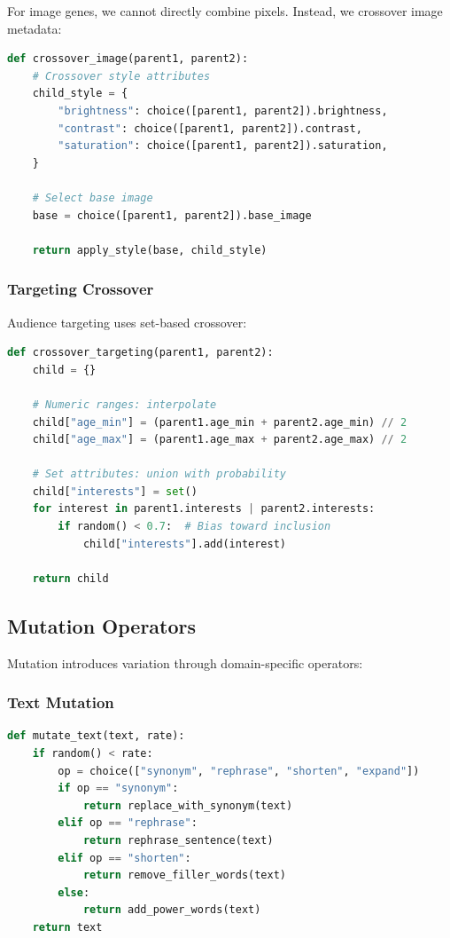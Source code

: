 \documentclass[11pt,twocolumn]{article}
\begin{document}
For image genes, we cannot directly combine pixels. Instead, we crossover image metadata:

\begin{lstlisting}[language=Python,caption=Image metadata crossover]
def crossover_image(parent1, parent2):
    # Crossover style attributes
    child_style = {
        "brightness": choice([parent1, parent2]).brightness,
        "contrast": choice([parent1, parent2]).contrast,
        "saturation": choice([parent1, parent2]).saturation,
    }

    # Select base image
    base = choice([parent1, parent2]).base_image

    return apply_style(base, child_style)
\end{lstlisting}

\subsubsection{Targeting Crossover}

Audience targeting uses set-based crossover:

\begin{lstlisting}[language=Python,caption=Audience crossover]
def crossover_targeting(parent1, parent2):
    child = {}

    # Numeric ranges: interpolate
    child["age_min"] = (parent1.age_min + parent2.age_min) // 2
    child["age_max"] = (parent1.age_max + parent2.age_max) // 2

    # Set attributes: union with probability
    child["interests"] = set()
    for interest in parent1.interests | parent2.interests:
        if random() < 0.7:  # Bias toward inclusion
            child["interests"].add(interest)

    return child
\end{lstlisting}

\subsection{Mutation Operators}

Mutation introduces variation through domain-specific operators:

\subsubsection{Text Mutation}

\begin{lstlisting}[language=Python,caption=Text mutation operators]
def mutate_text(text, rate):
    if random() < rate:
        op = choice(["synonym", "rephrase", "shorten", "expand"])
        if op == "synonym":
            return replace_with_synonym(text)
        elif op == "rephrase":
            return rephrase_sentence(text)
        elif op == "shorten":
            return remove_filler_words(text)
        else:
            return add_power_words(text)
    return text
\end{lstlisting}
\end{document}
